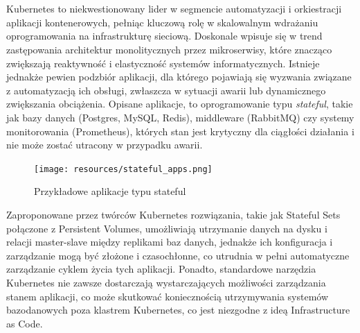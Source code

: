 \documentclass[polish]{aghengthesis}
\author{Dominika Bocheńczyk\\Mateusz Łopaciński\\Piotr Magiera\\Michał Wójcik}
\date{\the\year}
\begin{document}
\maketitle

\tableofcontents

\chapter{\ChapterTitleIntroduction}
\label{sec:wprowadzenie}

Kubernetes to niekwestionowany lider w segmencie automatyzacji i orkiestracji aplikacji kontenerowych, pełniąc kluczową rolę w skalowalnym wdrażaniu oprogramowania na infrastrukturę sieciową. Doskonale wpisuje się w trend zastępowania architektur monolitycznych przez mikroserwisy, które znacząco zwiększają reaktywność i elastyczność systemów informatycznych. Istnieje jednakże pewien podzbiór aplikacji, dla którego pojawiają się wyzwania związane z automatyzacją ich obsługi, zwłaszcza w sytuacji awarii lub dynamicznego zwiększania obciążenia. Opisane aplikacje, to oprogramowanie typu \textit{stateful}, takie jak bazy danych (Postgres, MySQL, Redis), middleware (RabbitMQ) czy systemy monitorowania (Prometheus), których stan jest krytyczny dla ciągłości działania i nie może zostać utracony w przypadku awarii.

\begin{figure}[!htbp]
    \centering
    \texttt{[image: resources/stateful\_apps.png]}
    \caption{Przykładowe aplikacje typu stateful}
    \label{fig:stateful}
\end{figure}

Zaproponowane przez twórców Kubernetes rozwiązania, takie jak Stateful Sets połączone z Persistent Volumes, umożliwiają utrzymanie danych na dysku i relacji master-slave między replikami baz danych, jednakże ich konfiguracja i zarządzanie mogą być złożone i czasochłonne, co utrudnia w pełni automatyczne zarządzanie cyklem życia tych aplikacji. Ponadto, standardowe narzędzia Kubernetes nie zawsze dostarczają wystarczających możliwości zarządzania stanem aplikacji, co może skutkować koniecznością utrzymywania systemów bazodanowych poza klastrem Kubernetes, co jest niezgodne z ideą Infrastructure as Code.

\chapter{\ChapterTitleTechStack}
\end{document}
